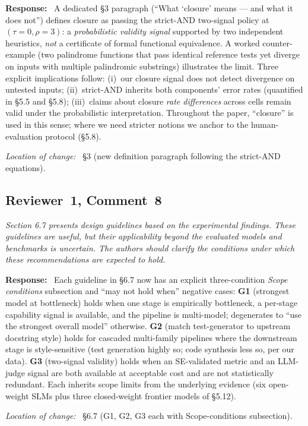 \documentclass[11pt,a4paper]{article}
\newenvironment{reviewerquote}
  {\begin{tcolorbox}[colback=black!5, colframe=black!15, boxrule=0.3pt,
                     arc=1pt, left=6pt, right=6pt, top=3pt, bottom=3pt,
                     breakable]\itshape\small}
  {\end{tcolorbox}}
\newcommand{\rcomment}[2]{\subsection*{Reviewer~#1, Comment~#2}}
\newcommand{\response}{\noindent\textbf{Response:}\ }
\newcommand{\loc}{\par\smallskip\noindent\textit{Location of change:}\ }
\begin{document}
\response{}
A dedicated \S3 paragraph (``What `closure' means --- and what it does not'') defines closure as passing the strict-AND two-signal policy at $(\tau = 0, \rho = 3)$: a \emph{probabilistic validity signal} supported by two independent heuristics, \emph{not} a certificate of formal functional equivalence. A worked counter-example (two palindrome functions that pass identical reference tests yet diverge on inputs with multiple palindromic substrings) illustrates the limit. Three explicit implications follow: (i)~our closure signal does not detect divergence on untested inputs; (ii)~strict-AND inherits both components' error rates (quantified in \S5.5 and \S5.8); (iii)~claims about closure \emph{rate differences} across cells remain valid under the probabilistic interpretation. Throughout the paper, ``closure'' is used in this sense; where we need stricter notions we anchor to the human-evaluation protocol (\S5.8).

\loc{} \S3 (new definition paragraph following the strict-AND equations).

\rcomment{1}{8}

\begin{reviewerquote}
Section 6.7 presents design guidelines based on the experimental findings. These guidelines are useful, but their applicability beyond the evaluated models and benchmarks is uncertain. The authors should clarify the conditions under which these recommendations are expected to hold.
\end{reviewerquote}

\response{}
Each guideline in \S6.7 now has an explicit three-condition \emph{Scope conditions} subsection and ``may not hold when'' negative cases: \textbf{G1} (strongest model at bottleneck) holds when one stage is empirically bottleneck, a per-stage capability signal is available, and the pipeline is multi-model; degenerates to ``use the strongest overall model'' otherwise. \textbf{G2} (match test-generator to upstream docstring style) holds for cascaded multi-family pipelines where the downstream stage is style-sensitive (test generation highly so; code synthesis less so, per our data). \textbf{G3} (two-signal validity) holds when an SE-validated metric and an LLM-judge signal are both available at acceptable cost and are not statistically redundant. Each inherits scope limits from the underlying evidence (six open-weight SLMs plus three closed-weight frontier models of \S5.12).

\loc{} \S6.7 (G1, G2, G3 each with Scope-conditions subsection).
\end{document}
